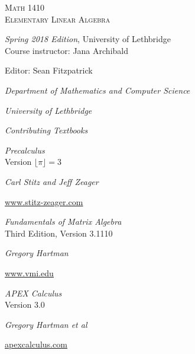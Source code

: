 
\hskip 125pt\begin{minipage}{\textwidth}
\begin{flushright}

\textsc{{\Huge Math 1410 \\
Elementary Linear Algebra}} \\

\bigskip

\textsl{\Large Spring 2018 Edition}, 
{\Large University of Lethbridge}\\
{\large Course instructor: Jana Archibald}


\bigskip

\Large
\vspace{1in}

Editor: Sean Fitzpatrick

\emph{\large Department of Mathematics and Computer Science}

\emph{\large University of Lethbridge}\vskip15pt

\parbox{200pt}{\textit{Contributing Textbooks}}\hskip 2cm \phantom{.}

\vspace{0.5in}

\textit{Precalculus}\\
{\large Version $\lfloor \pi\rfloor = 3$}

\emph{\large Carl Stitz and Jeff Zeager}

{\large \href{http://www.stitz-zeager.com}{\underline{www.stitz-zeager.com}}}\vskip 15pt

\textit{Fundamentals of Matrix Algebra}\\
{\large Third Edition, Version 3.1110}

\emph{\large Gregory Hartman}

{\large \href{http://www.vmi.edu/academics/departments/applied-mathematics/affordable-textbooks-apex/}{\underline{www.vmi.edu}}}\vskip 15pt

\textit{APEX Calculus}\\
{\large Version 3.0}

\emph{\large Gregory Hartman et al}

{\large \href{http://www.apexcalculus.com}{\underline{apexcalculus.com}}}\vskip 15pt


\normalsize
\end{flushright}
\end{minipage}

